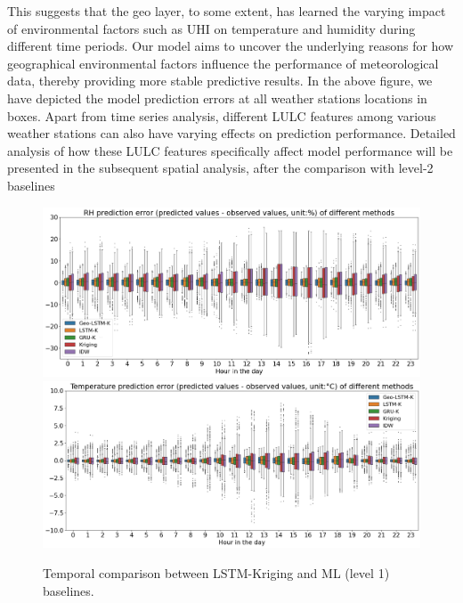 \documentclass[a4paper,fleqn]{cas-sc}
\begin{document}
This suggests that the geo layer, to some extent, has learned the varying impact of environmental factors such as UHI on temperature and humidity during different time periods. Our model aims to uncover the underlying reasons for how geographical environmental factors influence the performance of meteorological data, thereby providing more stable predictive results. In the above figure, we have depicted the model prediction errors at all weather stations locations in boxes. Apart from time series analysis, different LULC features among various weather stations can also have varying effects on prediction performance. Detailed analysis of how these LULC features specifically affect model performance will be presented in the subsequent spatial analysis, after the comparison with level-2 baselines



\begin{figure}[!h]
	\centering
        	\includegraphics[scale=0.38]{figs/new_figs/RH5models.png}
	    \includegraphics[scale=0.38]{figs/new_figs/Tem5models.png}
	\caption{Temporal comparison between LSTM-Kriging and ML (level 1) baselines.}
	\label{FIG:baselines1}
\end{figure}
\end{document}
